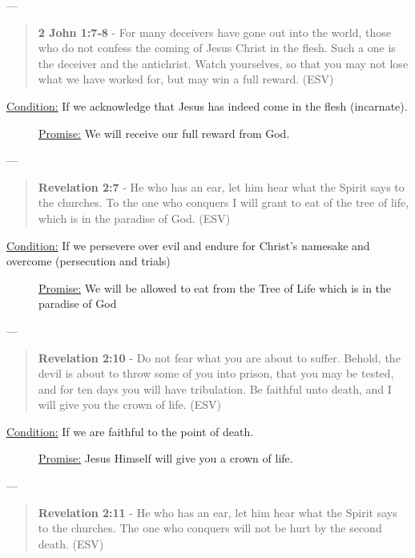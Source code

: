 \documentclass[11pt]{article}
\begin{document}
---

\begin{quote}
\textbf{2 John 1:7-8} - For many deceivers have gone out into the world, those who do not confess the coming of Jesus Christ in the flesh. Such a one is the deceiver and the antichrist. Watch yourselves, so that you may not lose what we have worked for, but may win a full reward. (ESV)
\end{quote}

\begin{description}
\item[{\uline{Condition:} If we acknowledge that Jesus has indeed come in the flesh (incarnate).}] \uline{Promise:} We will receive our full reward from God.
\end{description}

---

\begin{quote}
\textbf{Revelation 2:7} - He who has an ear, let him hear what the Spirit says to the churches. To the one who conquers I will grant to eat of the tree of life, which is in the paradise of God. (ESV)
\end{quote}

\begin{description}
\item[{\uline{Condition:} If we persevere over evil and endure for Christ's namesake and overcome (persecution and trials)}] \uline{Promise:} We will be allowed to eat from the Tree of Life which is in the paradise of God
\end{description}

---

\begin{quote}
\textbf{Revelation 2:10} - Do not fear what you are about to suffer. Behold, the devil is about to throw some of you into prison, that you may be tested, and for ten days you will have tribulation. Be faithful unto death, and I will give you the crown of life. (ESV)
\end{quote}

\begin{description}
\item[{\uline{Condition:} If we are faithful to the point of death.}] \uline{Promise:} Jesus Himself will give you a crown of life.
\end{description}

---

\begin{quote}
\textbf{Revelation 2:11} - He who has an ear, let him hear what the Spirit says to the churches. The one who conquers will not be hurt by the second death. (ESV)
\end{quote}
\end{document}
